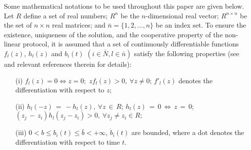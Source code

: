 \documentclass{cta-author}
\begin{document}
Some mathematical notations to be used throughout this paper are
given below. Let $R$ define a set of real numbers; $R^{n}$ be the
$n$-dimensional real vector; $R^{n\times n}$ be the set of $n\times
n$ real matrices; and $\bar{n}=\{1,2,\ldots, n\}$ be an index set.
To ensure the existence, uniqueness of the solution, and the
cooperative property of the non-linear protocol, it is assumed that a set
of continuously differentiable functions $f_{l}(z)$, $h_{l}(z)$ and
$b_{i}(t)$ $(i\in\bar{N}, l\in\bar{n})$ satisfy the following
properties (see  and
relevant references therein for details):
\begin{enumerate}[(iii)]
\item[(i)] $f_{l}(z)=0\Leftrightarrow z = 0;$ $z f_{l}(z)>0,\ \forall z\neq 0$; $f'_{l}(z)$ denotes the differentiation with respect to $z$;
\item[(ii)] $h_{l}(-z)\,{=}\,{-}h_{l}(z),\ \forall z \,{\in}\, R$; $h_{l}(z)\,{=}\,0\,{\Leftrightarrow}\, z \,{=}\, 0$;
$(z_{j}\,{-}\,z_{i}) h_{l}(z_{j}-z_{i})>0,\ \forall z_{j}\neq z_{i}\in R;$
\item[(iii)] $0<b\leq b_{i}(t)\leq \bar{b}<+\infty$, $\dot{b}_{i}(t)$ are bounded, where a dot denotes the differentiation with respect to time $t$.
\end{enumerate}
\end{document}
